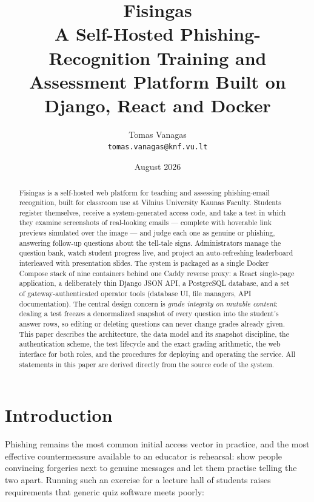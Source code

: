\documentclass[11pt,a4paper]{article}
\title{\textbf{Fisingas}\\[4pt]
  \large A Self-Hosted Phishing-Recognition Training and\\
  Assessment Platform Built on Django, React and Docker}
\author{Tomas Vanagas\\[2pt]
  \normalsize\texttt{tomas.vanagas@knf.vu.lt}}
\date{August 2026}
\begin{document}
\maketitle

\begin{abstract}
\noindent
Fisingas is a self-hosted web platform for teaching and assessing
phishing-email recognition, built for classroom use at Vilnius
University Kaunas Faculty. Students register themselves, receive a
system-generated access code, and take a test in which they examine
screenshots of real-looking emails --- complete with hoverable link
previews simulated over the image --- and judge each one as genuine or
phishing, answering follow-up questions about the tell-tale signs.
Administrators manage the question bank, watch student progress live,
and project an auto-refreshing leaderboard interleaved with
presentation slides. The system is packaged as a single Docker Compose
stack of nine containers behind one Caddy reverse proxy: a React
single-page application, a deliberately thin Django JSON API, a
PostgreSQL database, and a set of gateway-authenticated operator tools
(database UI, file managers, API documentation). The central design
concern is \emph{grade integrity on mutable content}: dealing a test
freezes a denormalized snapshot of every question into the student's
answer rows, so editing or deleting questions can never change grades
already given. This paper describes the architecture, the data model
and its snapshot discipline, the authentication scheme, the test
lifecycle and the exact grading arithmetic, the web interface for both
roles, and the procedures for deploying and operating the service. All
statements in this paper are derived directly from the source code of
the system.
\end{abstract}

\tableofcontents
\newpage

\section{Introduction}

Phishing remains the most common initial access vector in practice,
and the most effective countermeasure available to an educator is
rehearsal: show people convincing forgeries next to genuine messages
and let them practise telling the two apart. Running such an exercise
for a lecture hall of students raises requirements that generic quiz
software meets poorly:
\end{document}
